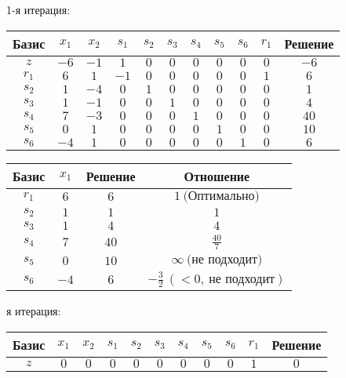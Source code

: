 \documentclass{article}%
\begin{document}
\begin{flushleft}%
1{-}я итерация: %
\newline%
\newline%
\renewcommand{\arraystretch}{1.3}%
\begin{tabular}{|c|ccccccccc|c|}%
\hline%
Базис&$x_{1}$&$x_{2}$&$s_{1}$&$s_{2}$&$s_{3}$&$s_{4}$&$s_{5}$&$s_{6}$&$r_{1}$&Решение\\%
\hline%
$z$&$-6$&$-1$&$1$&$0$&$0$&$0$&$0$&$0$&$0$&$-6$\\%
\hline%
$r_{1}$&$6$&$1$&$-1$&$0$&$0$&$0$&$0$&$0$&$1$&$6$\\%
$s_{2}$&$1$&$-4$&$0$&$1$&$0$&$0$&$0$&$0$&$0$&$1$\\%
$s_{3}$&$1$&$-1$&$0$&$0$&$1$&$0$&$0$&$0$&$0$&$4$\\%
$s_{4}$&$7$&$-3$&$0$&$0$&$0$&$1$&$0$&$0$&$0$&$40$\\%
$s_{5}$&$0$&$1$&$0$&$0$&$0$&$0$&$1$&$0$&$0$&$10$\\%
$s_{6}$&$-4$&$1$&$0$&$0$&$0$&$0$&$0$&$1$&$0$&$6$\\%
\hline%
\end{tabular}%
\newline%
\newline%
\newline%
\begin{tabular}{|cccc|}%
\hline%
Базис&$x_{1}$&Решение&Отношение\\%
\hline%
$r_{1}$&$6$&$6$&$1\: \text{(Оптимально)}$\\%
$s_{2}$&$1$&$1$&$1$\\%
$s_{3}$&$1$&$4$&$4$\\%
$s_{4}$&$7$&$40$&$\frac{40}{7}$\\%
$s_{5}$&$0$&$10$&$\infty \: \text{(не подходит)}$\\%
$s_{6}$&$-4$&$6$&$-\frac{3}{2}\: (< 0, \: \text{не подходит})$\\%
\hline%
\end{tabular}%
\newline%
\newline%
я итерация: %
\newline%
\newline%
\renewcommand{\arraystretch}{1.3}%
\begin{tabular}{|c|ccccccccc|c|}%
\hline%
Базис&$x_{1}$&$x_{2}$&$s_{1}$&$s_{2}$&$s_{3}$&$s_{4}$&$s_{5}$&$s_{6}$&$r_{1}$&Решение\\%
\hline%
$z$&$0$&$0$&$0$&$0$&$0$&$0$&$0$&$0$&$1$&$0$\\%

\end{tabular}
\end{flushleft}
\end{document}
